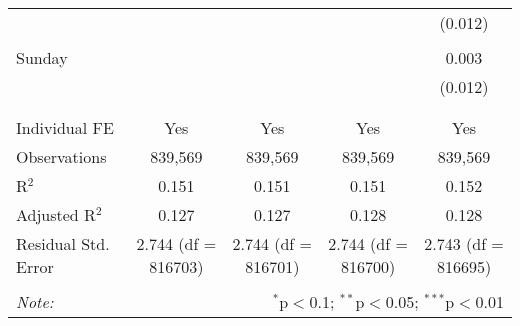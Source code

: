 \documentclass[
]{article}
\begin{document}
\begin{table}[!htbp]
{\begin{tabular}{@{\extracolsep{5pt}}lcccc}
  &  &  &  & (0.012) \\ 
  & & & & \\ 
 Sunday &  &  &  & 0.003 \\ 
  &  &  &  & (0.012) \\ 
  & & & & \\ 
\hline \\[-1.8ex] 
Individual FE & Yes & Yes & Yes & Yes \\ 
Observations & 839,569 & 839,569 & 839,569 & 839,569 \\ 
R$^{2}$ & 0.151 & 0.151 & 0.151 & 0.152 \\ 
Adjusted R$^{2}$ & 0.127 & 0.127 & 0.128 & 0.128 \\ 
Residual Std. Error & 2.744 (df = 816703) & 2.744 (df = 816701) & 2.744 (df = 816700) & 2.743 (df = 816695) \\ 
\hline 
\hline \\[-1.8ex] 
\textit{Note:}  & \multicolumn{4}{r}{$^{*}$p$<$0.1; $^{**}$p$<$0.05; $^{***}$p$<$0.01} \\ 
\end{tabular}
} 
\end{table} 
\newpage
\end{document}
